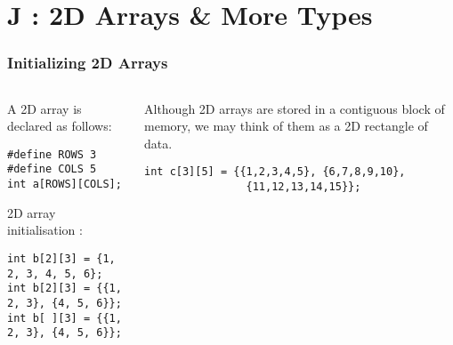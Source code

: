 \section{J : 2D Arrays \& More Types}
\label{chap:2darrs}

\begin{frame}[fragile]
\frametitle{Initializing 2D Arrays}
\begin{columns}

\begin{column}{0.45\textwidth}
A 2D array is declared as follows:
\begin{verbatim}
#define ROWS 3
#define COLS 5
int a[ROWS][COLS];
\end{verbatim}
 2D array initialisation :
\begin{verbatim}
int b[2][3] = {1, 2, 3, 4, 5, 6};
int b[2][3] = {{1, 2, 3}, {4, 5, 6}};
int b[ ][3] = {{1, 2, 3}, {4, 5, 6}};
\end{verbatim}
\end{column}

\pause
\begin{column}{0.45\textwidth}
Although 2D arrays are stored in a contiguous block of memory,
we may think of them as a 2D rectangle of data.
\begin{verbatim}
int c[3][5] = {{1,2,3,4,5}, {6,7,8,9,10},
                {11,12,13,14,15}};
\end{verbatim}
\begin{center}
\begin{figure}[h]
\end{figure}
\end{center}
\end{column}

\end{columns}
\end{frame}

